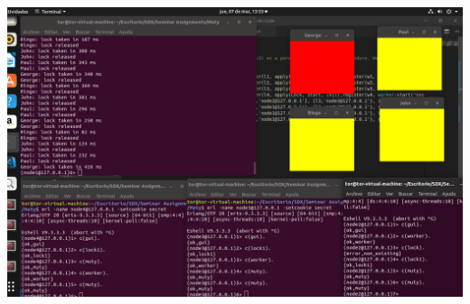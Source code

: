\documentclass[a4paper, 10pt]{article}
\begin{document}
\begin{enumerate}
\includegraphics[width=\textwidth]{muty-work}

\end{enumerate}
\end{document}
